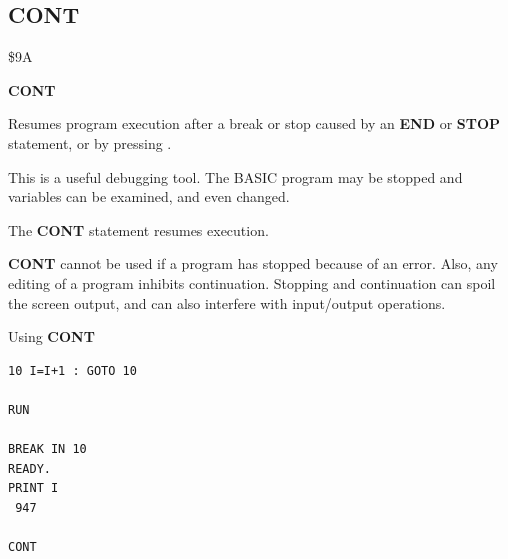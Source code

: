 
\newpage
\subsection{CONT}
\begin{description}[leftmargin=2cm,style=nextline]
\item [Token:]   \$9A

\item [Format:]  {\bf CONT}

\item [Usage:]   Resumes program execution after a break or stop caused by an {\bf END} or {\bf STOP} statement, or by pressing .

                 This is a useful debugging tool. The BASIC program may be stopped and variables can be examined, and even changed.
               
                 The {\bf CONT} statement resumes execution.

\item [Remarks:] {\bf CONT} cannot be used if a program has stopped because of an error. Also, any editing of a program inhibits continuation. Stopping and continuation can spoil the screen output, and can also interfere with input/output operations.

\item [Example:] Using {\bf CONT}

\begin{tcolorbox}[colback=black,coltext=white]
\verbatimfont{\codefont}
\begin{verbatim}
10 I=I+1 : GOTO 10

RUN

BREAK IN 10
READY.
PRINT I
 947

CONT
\end{verbatim}
\end{tcolorbox}
\end{description}


\newpage
